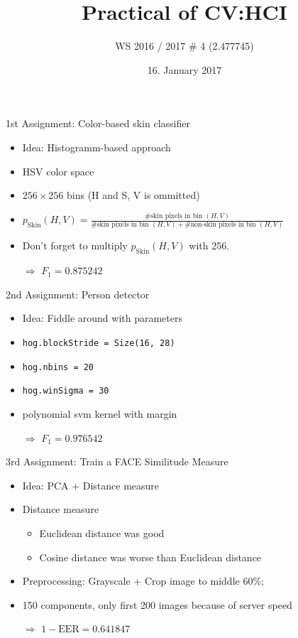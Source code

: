 \documentclass{beamer}
\title{Practical of CV:HCI}
\subtitle{WS 2016 / 2017 \# 4 (2.477745)}
\author[Martin\,Thoma \& Bettina\,Weller\& Yang\,Zhang]
{%
  \texorpdfstring{
    \begin{columns}%
      \column{.30\linewidth}
      \centering
      Martin Thoma\      \href{mailto:info@martin-thoma.de}{info@martin-thoma.de}
      \column{.30\linewidth}
      \centering
      Bettina Weller\\    \href{bettinaweller@web.de}{bettinaweller@web.de}
      \column{.30\linewidth}
      \centering
      Yang Zhang\\    \href{yang.zhang@student.kit.edu}{yang.zhang@student.kit.edu}
    \end{columns}
  }
  {John Doe \& Jane Doe}
}
\date{16. January 2017}
\begin{document}
\frame{\titlepage}

\begin{frame}{1st Assignment: Color-based skin classifier}
    \begin{itemize}
        \item Idea: Histogramm-based approach
        \item HSV color space
        \item $256 \times 256$ bins (H and S, V is ommitted)
        \item $p_\text{Skin}(H, V) = \frac{\text{\# skin pixels in bin } (H, V)}{\text{\# skin pixels in bin } (H, V) + \text{\# non-skin pixels in bin } (H, V)}$
        \item Don't forget to multiply $p_\text{Skin}(H, V)$ with 256.
        \item[$\Rightarrow$] $F_1 = 0.875242$
    \end{itemize}
\end{frame}

\begin{frame}{2nd Assignment: Person detector}
    \begin{itemize}
        \item Idea: Fiddle around with parameters
        \item \texttt{hog.blockStride = Size(16, 28)}
        \item \texttt{hog.nbins = 20}
        \item \texttt{hog.winSigma = 30}
        \item polynomial svm kernel with margin
        \item[$\Rightarrow$] $F_1 = 0.976542$ 
    \end{itemize}
\end{frame}

\begin{frame}{3rd Assignment: Train a FACE Similitude Measure}
    \begin{itemize}
        \item Idea: PCA + Distance measure
        \item Distance measure
        \begin{itemize}
            \item Euclidean distance was good
            \item Cosine distance was worse than Euclidean distance
        \end{itemize}
        \item Preprocessing: Grayscale + Crop image to middle 60\%; 
        \item 150 components, only first 200 images because of server speed
        \item[$\Rightarrow$] $1- \text{EER} = 0.641847$ 
    \end{itemize}
\end{frame}
\end{document}
